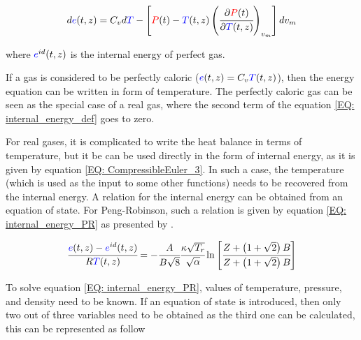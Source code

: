 \documentclass[../Article_Model_Parameters.tex]{subfiles}
\begin{document}
			{\footnotesize
				\begin{equation}
					d{\color{blue}e}(t,z)=C_vd{\color{blue}T}-\left[{\color{red}P}(t)-{\color{blue}T}(t,z)\left(\cfrac{\partial {\color{red}P}(t)}{\partial {\color{blue}T}(t,z)}\right)_{v_m}\right]dv_m
					\label{EQ: internal_energy_def}
				\end{equation} }
			
			where ${\color{blue}e}^{id}(t,z)$ is the internal energy of perfect gas.
			
			If a gas is considered to be perfectly caloric (${\color{blue}e}(t,z)=C_v {\color{blue}T}(t,z)$), then the energy equation can be written in form of temperature. The perfectly caloric gas can be seen as the special case of a real gas, where the second term of the equation \ref{EQ: internal_energy_def} goes to zero.
			
			For real gases, it is complicated to write the heat balance in terms of temperature, but it be can be used directly in the form of internal energy, as it is given by equation \ref{EQ: CompressibleEuler_3}. In such a case, the temperature (which is used as the input to some other functions) needs to be recovered from the internal energy. A relation for the internal energy can be obtained from an equation of state. For Peng-Robinson, such a relation is given by equation \ref{EQ: internal_energy_PR} as presented by \citet{Elliott2011}.
			
		
			{\footnotesize
				\begin{equation}
					\cfrac{{\color{blue}e}(t,z)-{\color{blue}e}^{id}(t,z)}{R{\color{blue}T}(t,z)} = - \cfrac{A}{B\sqrt{8}} \cfrac{\kappa \sqrt{T_r}}{\sqrt{\alpha}} \ln \left[ \cfrac{Z+\left( 1+\sqrt{2} \right)B}{Z+\left( 1+\sqrt{2} \right)B} \right]
					\label{EQ: internal_energy_PR}
				\end{equation}
			}
			
			To solve equation \ref{EQ: internal_energy_PR}, values of temperature, pressure, and density need to be known. If an equation of state is introduced, then only two out of three variables need to be obtained as the third one can be calculated, this can be represented as follow
			
\end{document}
